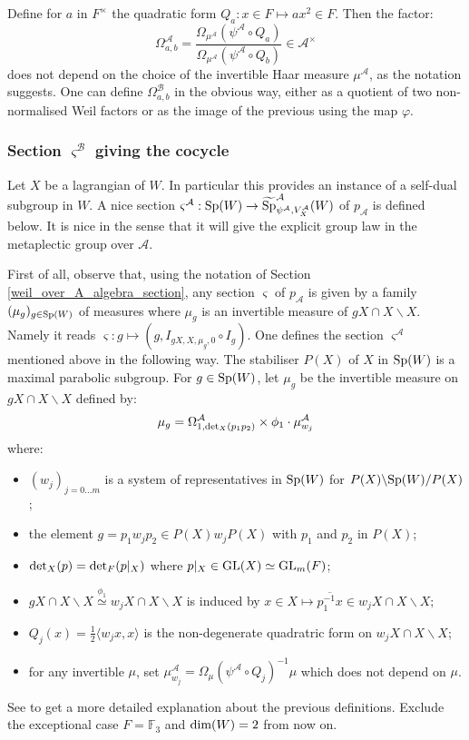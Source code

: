 \documentclass[11pt]{article}
\theoremstyle{plain}
\theoremstyle{definition}
\theoremstyle{plain}
\theoremstyle{definition}
\theoremstyle{plain}
\begin{document}
Define for $a$ in $F^\times$ the quadratic form $Q_a : x \in F \mapsto a x^2 \in F$. Then the factor:
$$\Omega_{a,b}^\mathcal{A} =  \frac{\Omega_{\mu^\mathcal{A}}(\psi^\mathcal{A} \circ Q_a)}{\Omega_{\mu^\mathcal{A}}( \psi^\mathcal{A} \circ Q_b)} \in \mathcal{A}^\times$$
does not depend on the choice of the invertible Haar measure $\mu^\mathcal{A}$, as the notation suggests. One can define $\Omega_{a,b}^\mathcal{B}$ in the obvious way, either as a quotient of two non-normalised Weil factors or as the image of the previous using the map $\varphi$.

\subsubsection{Section $\varsigma^\mathcal{B}$ giving the cocycle} \label{section_sigma_cocycle_section}

Let $X$ be a lagrangian of $W$. In particular this provides an instance of a self-dual subgroup in $W$. A nice section $\varsigma^\mathcal{A} : \textup{Sp}(W) \to \widetilde{\textup{Sp}}_{\psi^\mathcal{A},V_X^\mathcal{A}}^\mathcal{A}(W)$ of $p_\mathcal{A}$ is defined below. It is nice in the sense that it will give the explicit group law in the metaplectic group over $\mathcal{A}$.

First of all, observe that, using the notation of Section \ref{weil_over_A_algebra_section}, any section $\varsigma$ of $p_\mathcal{A}$ is given by a family $(\mu_g)_{g \in \textup{Sp}(W)}$ of measures where $\mu_g$ is an invertible measure of $g X \cap X \backslash X$. Namely it reads $\varsigma : g \mapsto (g,I_{gX,X,\mu_g,0} \circ I_g)$. One defines the section $\varsigma^\mathcal{A}$ mentioned above in the following way. The stabiliser $P(X)$ of $X$ in $\textup{Sp}(W)$ is a maximal parabolic subgroup. For $g \in \textup{Sp}(W)$, let $\mu_g$ be the invertible measure on $gX \cap X \backslash X$ defined by:
$$\mu_g = \Omega_{1,\textup{det}_X(p_1p_2)}^\mathcal{A} \times \phi_1 \cdot \mu_{w_j}^\mathcal{A}$$
where:
\begin{itemize}
\item $(w_j)_{j=0 \dots m}$ is a system of representatives in $\textup{Sp}(W)$ for $P(X) \backslash \textup{Sp}(W) / P(X)$;
\item the element $g = p_1 w_j p_2 \in P(X) w_j P(X)$ with $p_1$ and $p_2$ in $P(X)$;
\item $\textup{det}_X(p) = \textup{det}_F(p|_X)$ where $p|_X \in \textup{GL}(X) \simeq \textup{GL}_m(F)$;
\item $gX \cap X \backslash X \overset{\phi_1}{\simeq} w_j X \cap X \backslash X$ is induced by $x \in X \mapsto \overline{p_1^{-1} x} \in w_j X \cap X \backslash X$;
\item $Q_j(x) = \frac{1}{2} \langle w_j x , x \rangle$ is the non-degenerate quadratric form on $w_j X \cap X \backslash X$;
\item for any invertible $\mu$, set $\mu_{w_j}^\mathcal{A} = \Omega_\mu(\psi^\mathcal{A} \circ Q_j)^{-1} \mu$ which does not depend on $\mu$. \end{itemize}
See \cite[Sec. 3.5]{trias_theta1} to get a more detailed explanation about the previous definitions. Exclude the exceptional case $F=\mathbb{F}_3$ and $\textup{dim}(W) =2$ from now on.
\end{document}
